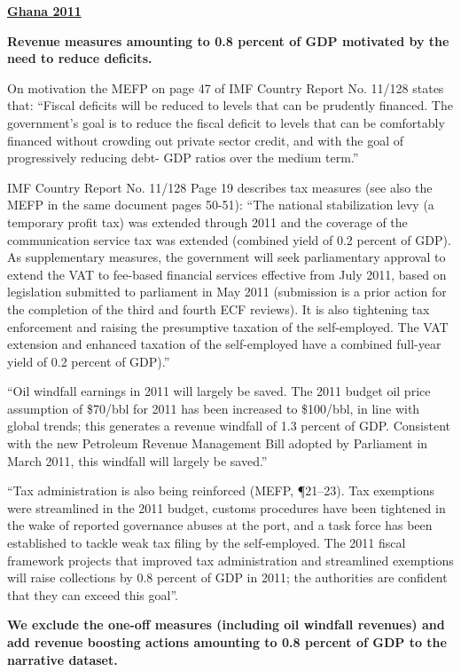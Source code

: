 \textbf{\underline{Ghana 2011}}

\textbf{Revenue measures amounting to 0.8 percent of GDP motivated by the need to reduce deficits.}

On motivation the MEFP on page 47 of IMF Country Report No. 11/128  states that: “Fiscal deficits will be reduced to levels that can be prudently financed. The government’s goal is to reduce the fiscal deficit to levels that can be comfortably financed without crowding out private sector credit, and with the goal of progressively reducing debt- GDP ratios over the medium term.”

IMF Country Report No. 11/128  Page 19 describes tax measures (see also the MEFP in the same document pages 50-51): “The national stabilization levy (a temporary profit tax) was extended through 2011 and the coverage of the communication service tax was extended (combined yield of 0.2 percent of GDP). As supplementary measures, the government will seek parliamentary approval to extend the VAT to fee-based financial services effective from July 2011, based on legislation submitted to parliament in May 2011 (submission is a prior action for the completion of the third and fourth ECF reviews). It is also tightening tax enforcement and raising the presumptive taxation of the self-employed. The VAT extension and enhanced taxation of the self-employed have a combined full-year yield of 0.2 percent of GDP).”

“Oil windfall earnings in 2011 will largely be saved. The 2011 budget oil price assumption of \$70/bbl for 2011 has been increased to \$100/bbl, in line with global trends; this generates a revenue windfall of 1.3 percent of GDP. Consistent with the new Petroleum Revenue Management Bill adopted by Parliament in March 2011, this windfall will largely be saved.”

“Tax administration is also being reinforced (MEFP, ¶21–23). Tax exemptions were streamlined in the 2011 budget, customs procedures have been tightened in the wake of reported governance abuses at the port, and a task force has been established to tackle weak tax filing by the self-employed. The 2011 fiscal framework projects that improved tax administration and streamlined exemptions will raise collections by 0.8 percent of GDP in 2011; the authorities are confident that they can exceed this goal”.

\textbf{We exclude the one-off measures (including oil windfall revenues) and add revenue boosting actions amounting to 0.8 percent of GDP to the narrative dataset.} 

